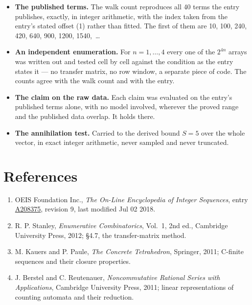 \documentclass[11pt]{article}
\theoremstyle{definition}
\begin{document}
\begin{itemize}

\item {\bfseries The published terms.} The walk count reproduces all 40 terms the entry publishes, exactly, in integer arithmetic, with the index taken from the entry's stated offset (1) rather than fitted. The first of them are 10, 100, 240, 420, 640, 900, 1200, 1540,~\dots

\item {\bfseries An independent enumeration.} For $n = 1,\dots,4$ every one of the $2^{4n}$ arrays was written out and tested cell by cell against the condition as the entry states it --- no transfer matrix, no row window, a separate piece of code. The counts agree with the walk count and with the entry.

\item {\bfseries The claim on the raw data.} Each claim was evaluated on the entry's published terms alone, with no model involved, wherever the proved range and the published data overlap. It holds there.

\item {\bfseries The annihilation test.} Carried to the derived bound $S = 5$ over the whole vector, in exact integer arithmetic, never sampled and never truncated.

\end{itemize}

\section{References}

\begin{enumerate}

\item OEIS Foundation Inc., \emph{The On-Line Encyclopedia of Integer Sequences}, entry \href{https://oeis.org/A208375}{A208375}, revision 9, last modified Jul 02 2018.

\item R. P. Stanley, \emph{Enumerative Combinatorics}, Vol.~1, 2nd ed., Cambridge University Press, 2012; \S4.7, the transfer-matrix method.

\item M. Kauers and P. Paule, \emph{The Concrete Tetrahedron}, Springer, 2011; C-finite sequences and their closure properties.

\item J. Berstel and C. Reutenauer, \emph{Noncommutative Rational Series with Applications}, Cambridge University Press, 2011; linear representations of counting automata and their reduction.

\end{enumerate}
\end{document}
